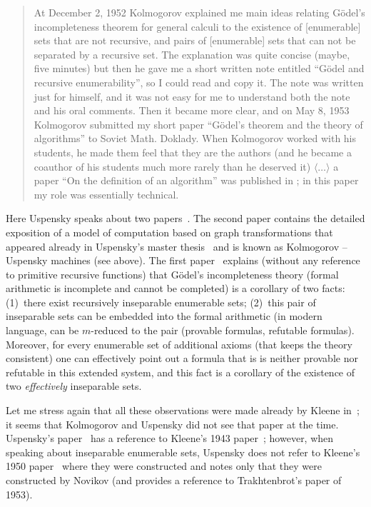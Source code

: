 \documentclass[12pt]{article}
\theoremstyle{remark}
\begin{document}
\begin{quote}

At December 2, 1952 Kolmogorov explained me main ideas relating G\"{o}del's incompleteness theorem for general calculi to the existence of [enumerable] sets that are not recursive, and pairs of [enumerable] sets that can not be separated by a recursive set. The explanation was quite concise (maybe, five minutes) but then he gave me a short written note entitled ``G\"{o}del and recursive enumerability'', so I could read and copy it. The note was written just for himself, and it was not easy for me to understand both the note and his oral comments. Then it became more clear, and on May 8, 1953 Kolmogorov submitted my short paper ``G\"{o}del's theorem and the theory of algorithms'' to Soviet Math. Doklady. When Kolmogorov worked with his students, he made them feel that they are the authors (and he became a coauthor of his students much more rarely than he deserved it) $\langle\ldots\rangle$ a paper ``On the definition of an algorithm'' was published in ; in this paper my role was essentially technical.
\end{quote}
Here Uspensky speaks about two papers~\cite{1953,1958}. The second paper contains the detailed exposition of a model of computation based on graph transformations that appeared already in Uspensky's master thesis~\cite{1952} and is known as Kolmogorov -- Uspensky machines (see above). The first paper~\cite{1953} explains (without any reference to primitive recursive functions) that G\"{o}del's incompleteness theory (formal arithmetic is incomplete and cannot be completed) is a corollary of two facts: (1)~there exist recursively inseparable enumerable sets; (2)~this pair of inseparable sets can be embedded into the formal arithmetic (in modern language, can be $m$-reduced to the pair (provable formulas, refutable formulas). Moreover, for every enumerable set of additional axioms (that keeps the theory consistent) one can effectively point out a formula that is is neither provable nor refutable in this extended system, and this fact is a corollary of the existence of two \emph{effectively} inseparable sets.

Let me stress again that all these observations were  made already by Kleene in~\cite{Kleene1950}; it seems that Kolmogorov and Uspensky did not see that paper at the time.  Uspensky's paper~\cite{1953} has a reference to Kleene's 1943 paper~\cite{Kleene1943}; however, when speaking about inseparable enumerable sets, Uspensky does not refer to Kleene's 1950 paper~\cite{Kleene1950} where they were constructed and notes only that they were constructed by Novikov (and provides a reference to Trakhtenbrot's paper of 1953).
\end{document}
